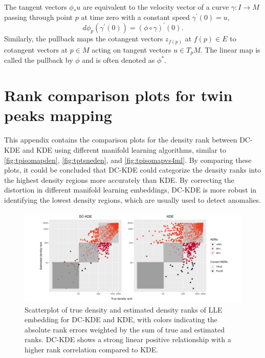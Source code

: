 \documentclass[12pt]{article}
\begin{document}
The tangent vectors \(\phi_*u\) are equivalent to the velocity vector of a curve \(\gamma: I\rightarrow M\) passing through point \(p\) at time zero with a constant speed \(\gamma^{\prime}(0)=u\),
\[
d\phi_p(\gamma^{\prime}(0)) = (\phi \circ \gamma)^\prime (0).
\]
Similarly, the pullback maps the cotangent vectors \(z_{f(p)}\) at \(f(p) \in E\) to cotangent vectors at \(p \in M\) acting on tangent vectors \(u \in T_pM\). The linear map is called the pullback by \(\phi\) and is often denoted as \(\phi^*\).

\hypertarget{twinpeaksappe}{%
\section{Rank comparison plots for twin peaks mapping}\label{twinpeaksappe}}

This appendix contains the comparison plots for the density rank between DC-KDE and KDE using different manifold learning algorithms, similar to \autoref{fig:tpisomapden}, \autoref{fig:tptsneden}, and \autoref{fig:tpisomapvs4ml}. By comparing these plots, it could be concluded that DC-KDE could categorize the density ranks into the highest density regions more accurately than KDE. By correcting the distortion in different manifold learning embeddings, DC-KDE is more robust in identifying the lowest density regions, which are usually used to detect anomalies.

\begin{figure}

{\centering \includegraphics[width=1\linewidth]{figures/Twin Peak2000_densityrank_comparison_lle_radius8_r0_5_logrank_rec_colprob_smallblocks3_crossfalse} 

}

\caption{Scatterplot of true density and estimated density ranks of LLE embedding for DC-KDE and KDE, with colors indicating the absolute rank errors weighted by the sum of true and estimated ranks. DC-KDE shows a strong linear positive relationship with a higher rank correlation compared to KDE.}\label{fig:tplleden}
\end{figure}
\end{document}
